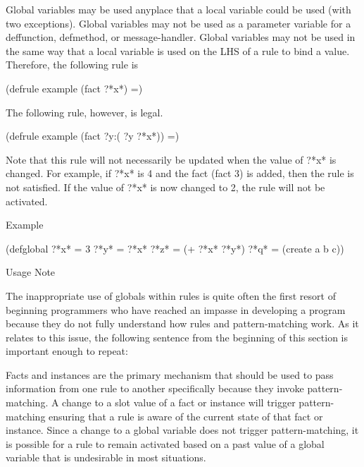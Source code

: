 \documentclass[letterpaper,10pt,english]{sphinxmanual}
\begin{document}
Global variables may be used anyplace that a local variable could be
used (with two exceptions). Global variables may not be used as a
parameter variable for a deffunction, defmethod, or message-handler.
Global variables may not be used in the same way that a local variable
is used on the LHS of a rule to bind a value. Therefore, the following
rule is 

\begin{sphinxVerbatim}[commandchars=\\\{\}]
(defrule example
  (fact ?*x*)
  =\PYGZgt{})
\end{sphinxVerbatim}

The following rule, however, is legal.

\begin{sphinxVerbatim}[commandchars=\\\{\}]
(defrule example
  (fact ?y\PYGZam{}:(\PYGZgt{} ?y ?*x*))
  =\PYGZgt{})
\end{sphinxVerbatim}

Note that this rule will not necessarily be updated when the value of
?*x* is changed. For example, if ?*x* is 4 and the fact (fact 3) is
added, then the rule is not satisfied. If the value of ?*x* is now
changed to 2, the rule will not be activated.

Example

\begin{sphinxVerbatim}[commandchars=\\\{\}]
(defglobal
  ?*x* = 3
  ?*y* = ?*x*
  ?*z* = (+ ?*x* ?*y*)
  ?*q* = (create\PYGZdl{} a b c))
\end{sphinxVerbatim}

Usage Note

The inappropriate use of globals within rules is quite often the first
resort of beginning programmers who have reached an impasse in
developing a program because they do not fully understand how rules and
pattern-matching work. As it relates to this issue, the following
sentence from the beginning of this section is important enough to
repeat:


Facts and instances are the primary mechanism that should be used to
pass information from one rule to another specifically because they 
invoke pattern-matching. A change to a slot value of a fact or instance
will trigger pattern-matching ensuring that a rule is aware of the
current state of that fact or instance. Since a change to a global
variable does not trigger pattern-matching, it is possible for a rule to
remain activated based on a past value of a global variable that is
undesirable in most situations.
\end{document}
